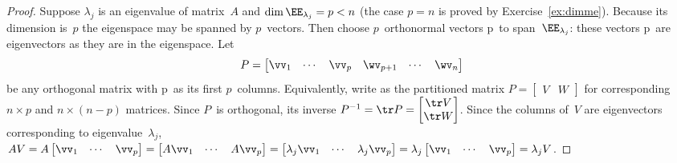 \begin{proof} 
Suppose \(\lambda_j\) is an eigenvalue of matrix~\(A\) and \(\dim\EE_{\lambda_j}=p<n\) (the case \(p=n\) is proved by Exercise~\ref{ex:dimme}).
Because its dimension is~\(p\) the eigenspace may be spanned by \(p\)~vectors.
Then choose \(p\)~orthonormal vectors \hlist\vv p\ to span~\(\EE_{\lambda_j}\): these vectors \hlist\vv p\ are eigenvectors as they are in the eigenspace.
Let
\begin{equation*}
P=\begin{bmatrix} \vv_1&\cdots&\vv_p&\wv_{p+1}&\cdots&\wv_n \end{bmatrix}
\end{equation*}
be any orthogonal matrix with \hlist\vv p\ as its first \(p\)~columns.
Equivalently, write as the partitioned matrix \(P=\begin{bmatrix} V&W \end{bmatrix}\) for corresponding \(n\times p\) and \(n\times(n-p)\) matrices.
Since \(P\)~is orthogonal, its inverse \(P^{-1}=\tr P=\begin{bmatrix} \tr V\\\tr W \end{bmatrix}\).
Since the columns of~\(V\) are eigenvectors corresponding to eigenvalue~\(\lambda_j\), \(AV=A\begin{bmatrix} \vv_1&\cdots&\vv_p \end{bmatrix}
=\begin{bmatrix} A\vv_1&\cdots&A\vv_p \end{bmatrix}
=\begin{bmatrix} \lambda_j\vv_1&\cdots&\lambda_j\vv_p \end{bmatrix}
=\lambda_j\begin{bmatrix} \vv_1&\cdots&\vv_p \end{bmatrix}
=\lambda_jV\).


\end{proof}
